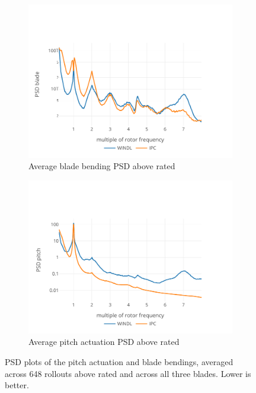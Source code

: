 \begin{figure}
  \centering
  \begin{subfigure}[b]{0.48\textwidth}
      \centering
      \includegraphics[width=\textwidth]{images/turbulent_psd_blade.pdf}
      \caption{Average blade bending PSD above rated}
      \label{fig:adjusted-psd-blade}
  \end{subfigure}
  \begin{subfigure}[b]{0.48\textwidth}
    \centering
    \includegraphics[width=\textwidth]{images/turbulent_psd_pitch.pdf}
    \caption{Average pitch actuation PSD above rated}
    \label{fig:adjusted-psd-pitch}
  \end{subfigure}
  \caption{PSD plots of the pitch actuation and blade bendings, averaged across 648 rollouts above rated and across all three blades. Lower is better.}
  \label{fig:adjusted-psd}
\end{figure}

